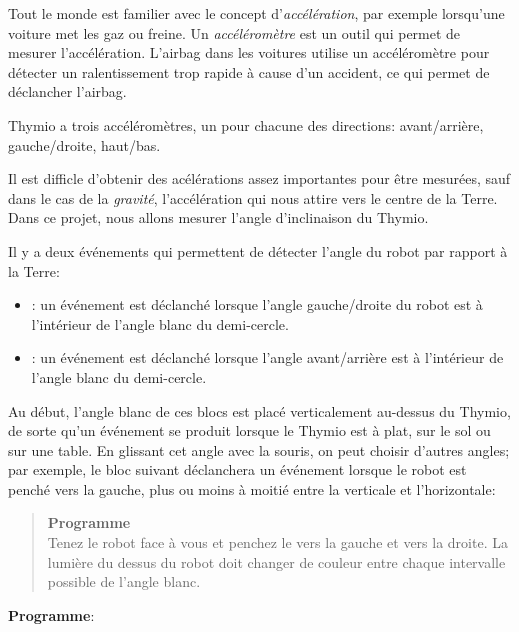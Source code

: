 \label{ch.angles}

Tout le monde est familier avec le concept d'\emph{accélération}, par exemple lorsqu'une voiture met les gaz ou freine.
Un \emph{accéléromètre} est un outil qui permet de mesurer
l'accélération.
L'airbag dans les voitures utilise un accéléromètre pour
détecter un ralentissement trop rapide à cause d'un accident,
ce qui permet de déclancher l'airbag.

Thymio a trois accéléromètres, un pour chacune des directions:
avant/arrière, gauche/droite, haut/bas.

Il est difficle d'obtenir des acélérations assez importantes
pour être mesurées, sauf dans le cas de la \emph{gravité}, l'accélération qui nous attire vers le centre de la Terre.
Dans ce projet, nous allons mesurer l'angle d'inclinaison
du Thymio.

Il y a deux événements qui permettent de détecter l'angle
du robot par rapport à la Terre: \label{p.accel}

\begin{itemize}

\item {}: un événement est déclanché lorsque l'angle gauche/droite du robot est à l'intérieur de l'angle blanc
du demi-cercle.

\item {}: un événement est déclanché 
lorsque l'angle avant/arrière est à l'intérieur
de l'angle blanc du demi-cercle.

\end{itemize}

Au début, l'angle blanc de ces blocs est placé verticalement
au-dessus du Thymio, de sorte qu'un événement se produit
lorsque le Thymio est à plat, sur le sol ou sur une table.
En glissant cet angle avec la souris, on peut choisir 
d'autres angles; par exemple, le bloc suivant
déclanchera un événement lorsque le robot est penché vers la
gauche, plus ou moins à moitié entre la verticale et
l'horizontale:

\begin{quote}
\textbf{Programme}\\
Tenez le robot face à vous et penchez le vers la gauche
et vers la droite.
La lumière du dessus du robot doit changer de couleur
entre chaque intervalle possible de l'angle blanc.
\end{quote}

{\raggedleft \hfill \textbf{Programme}: }

